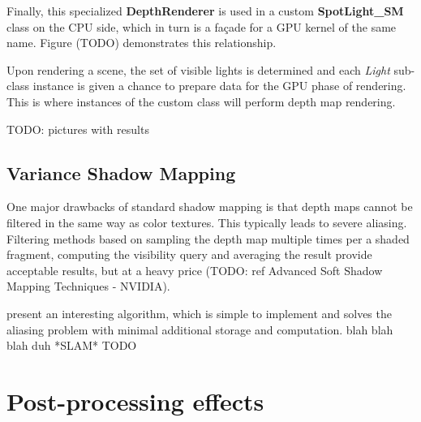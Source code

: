 Finally, this specialized \textbf{DepthRenderer} is used in a custom \textbf{SpotLight\_SM} class on the CPU side, which in turn is a façade for a GPU kernel of the same name. Figure (TODO) demonstrates this relationship.

Upon rendering a scene, the set of visible lights is determined and each \emph{Light} sub-class instance is given a chance to prepare data for the GPU phase of rendering. This is where instances of the custom class will perform depth map rendering.

TODO: pictures with results

\subsection{Variance Shadow Mapping}

One major drawbacks of standard shadow mapping is that depth maps cannot be filtered in the same way as color textures. This typically leads to severe aliasing. Filtering methods based on sampling the depth map multiple times per a shaded fragment, computing the visibility query and averaging the result provide acceptable results, but at a heavy price (TODO: ref Advanced Soft Shadow Mapping Techniques - NVIDIA).

\citet{Donnelly06varianceshadow} present an interesting algorithm, which is simple to implement and solves the aliasing problem with minimal additional storage and computation. blah blah blah duh *SLAM* TODO

\clearpage
\section{Post-processing effects}
